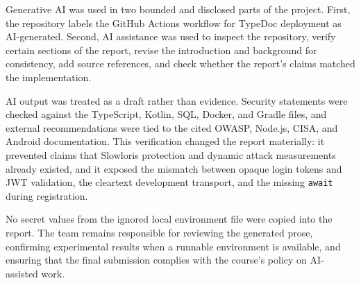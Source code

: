 Generative AI was used in two bounded and disclosed parts of the project. First, the repository labels the GitHub Actions workflow for TypeDoc deployment as AI-generated. Second, AI assistance was used to inspect the repository, verify certain sections of the report, revise the introduction and background for consistency, add source references, and check whether the report's claims matched the implementation.

AI output was treated as a draft rather than evidence. Security statements were checked against the TypeScript, Kotlin, SQL, Docker, and Gradle files, and external recommendations were tied to the cited OWASP, Node.js, CISA, and Android documentation. This verification changed the report materially: it prevented claims that Slowloris protection and dynamic attack measurements already existed, and it exposed the mismatch between opaque login tokens and JWT validation, the cleartext development transport, and the missing \verb|await| during registration.

No secret values from the ignored local environment file were copied into the report. The team remains responsible for reviewing the generated prose, confirming experimental results when a runnable environment is available, and ensuring that the final submission complies with the course's policy on AI-assisted work.
